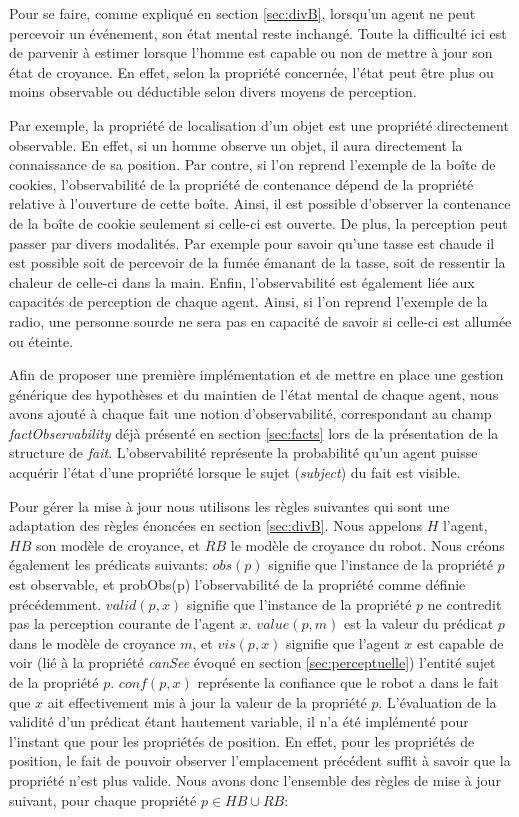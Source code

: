 \documentclass[a4paper,11pt,twoside]{StyleThese}
\begin{document}
Pour se faire, comme expliqué en section \ref{sec:divB}, lorsqu'un agent ne peut percevoir un événement, son état mental reste inchangé.
Toute la difficulté ici est de parvenir à estimer lorsque l'homme est capable ou non de mettre à jour son état de croyance.
En effet, selon la propriété concernée, l'état peut être plus ou moins observable ou déductible selon divers moyens de perception.

Par exemple, la propriété de localisation d'un objet est une propriété directement observable. En effet, si un homme observe un objet, il aura directement la connaissance de sa position. Par contre, si l'on reprend l'exemple de la boîte de cookies, l'observabilité de la propriété de contenance dépend de la propriété relative à l'ouverture de cette boîte. Ainsi, il est possible d'observer la contenance de la boîte de cookie seulement si celle-ci est ouverte.
De plus, la perception peut passer par divers modalités. Par exemple pour savoir qu'une tasse est chaude il est possible soit de percevoir de la fumée émanant de la tasse, soit de ressentir la chaleur de celle-ci dans la main.
Enfin, l'observabilité est également liée aux capacités de perception de chaque agent. Ainsi, si l'on reprend l'exemple de la radio, une personne sourde ne sera pas en capacité de savoir si celle-ci est allumée ou éteinte.

Afin de proposer une première implémentation et de mettre en place une gestion générique des hypothèses et du maintien de l'état mental de chaque agent, nous avons ajouté à chaque fait une notion d'observabilité, correspondant au champ \textit{factObservability} déjà présenté en section \ref{sec:facts} lors de la présentation de la structure de \textit{fait}.
L'observabilité représente la probabilité qu'un agent puisse acquérir l'état d'une propriété lorsque le sujet (\textit{subject}) du fait est visible.

Pour gérer la mise à jour nous utilisons les règles suivantes qui sont une adaptation des règles énoncées en section \ref{sec:divB}. 
Nous appelons $H$ l'agent, $HB$ son modèle de croyance, et $RB$ le modèle de croyance du robot. Nous créons également les prédicats suivants: $obs(p)$ signifie que l'instance de la propriété $p$ est observable, et probObs(p) l'observabilité de la propriété comme définie précédemment. $valid(p,x)$ signifie que l'instance de la propriété $p$ ne contredit pas la perception courante de l'agent $x$. $value(p,m)$ est la valeur du prédicat $p$ dans le modèle de croyance $m$, et $vis(p,x)$ signifie que l'agent $x$ est capable de voir (lié à la propriété \textit{canSee} évoqué en section \ref{sec:perceptuelle}) l'entité sujet de la propriété $p$. $conf(p,x)$ représente la confiance que le robot a dans le fait que $x$ ait effectivement mis à jour la valeur de la propriété $p$. L'évaluation de la validité d'un prédicat étant hautement variable, il n'a été implémenté pour l'instant que pour les propriétés de position. En effet, pour les propriétés de position, le fait de pouvoir observer l'emplacement précédent suffit à savoir que la propriété n'est plus valide.
Nous avons donc l'ensemble des règles de mise à jour suivant, pour chaque propriété  $p\in HB \cup RB$: 
\end{document}
